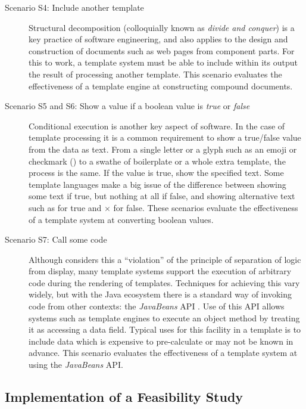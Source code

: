 \begin{description}
\item[Scenario S4: Include another template] \hfill

Structural decomposition (colloquially known as \emph{divide and conquer}) is a key practice of software engineering, and also applies to the design and construction of documents such as web pages from component parts. For this to work, a template system must be able to include within its output the result of processing another template. This scenario evaluates the effectiveness of a template engine at constructing compound documents.

\item[Scenario S5 and S6: Show a value if a boolean value is \emph{true} or \emph{false}] \hfill

Conditional execution is another key aspect of software. In the case of template processing it is a common requirement to show a true/false value from the data as text. From a single letter or a glyph such as an emoji or checkmark (\checkmark) to a swathe of boilerplate or a whole extra template, the process is the same. If the value is true, show the specified text. Some template languages make a big issue of the difference between showing some text if true, but nothing at all if false, and showing alternative text such as \checkmark for true and $\times$ for false. These scenarios evaluate the effectiveness of a template system at converting boolean values.

\item[Scenario S7: Call some code] \hfill

Although \citeauthor{Parr2004} considers this a \enquote{violation} of the principle of separation of logic from display, many template systems support the execution of arbitrary code during the rendering of templates. Techniques for achieving this vary widely, but with the Java ecosystem there is a standard way of invoking code from other contexts: the \emph{JavaBeans} API \citep{Oracle2018JavaBean}. Use of this API allows systems such as template engines to execute an object method by treating it as accessing a data field. Typical uses for this facility in a template is to include data which is expensive to pre-calculate or may not be known in advance. This scenario evaluates the effectiveness of a template system at using the \emph{JavaBeans} API.

\end{description}

\subsection{Implementation of a Feasibility Study}

